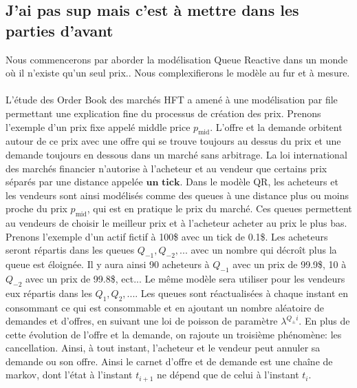 \documentclass[12pt,a4paper]{article}
\theoremstyle{definition}
\theoremstyle{remark}
\begin{document}
\subsection{J'ai pas sup mais c'est à mettre dans les parties d'avant}
Nous commencerons par aborder la modélisation Queue Reactive dans un monde où il n'existe qu'un seul prix.. Nous complexifierons le modèle au fur et à mesure.
\\
\\
L'étude des Order Book des marchés HFT a amené à une modélisation par file permettant une explication fine du processus de création des prix. Prenons l'exemple d'un prix fixe appelé middle price $p_{\text{mid}}$. L'offre et la demande orbitent autour de ce prix avec une offre qui se trouve toujours au dessus du prix et une demande toujours en dessous dans un marché sans arbitrage. La loi international des marchés financier n'autorise à l'acheteur et au vendeur que certains prix séparés par une distance appelée $\textbf{un tick}$. Dans le modèle QR, les acheteurs et les vendeurs sont ainsi modélisés comme des queues à une distance plus ou moins proche du prix $p_{\text{mid}}$, qui est en pratique le prix du marché. Ces queues permettent au vendeurs de choisir le meilleur prix et à l'acheteur acheter au prix le plus bas. Prenons l'exemple d'un actif fictif à 100\$ avec un tick de 0.1\$. Les acheteurs seront répartis dans les queues $Q_{-1},Q_{-2},...$ avec un nombre qui décroît plus la queue est éloignée. Il y aura ainsi 90 acheteurs à $Q_{-1}$ avec un prix de 99.9\$, 10 à $Q_{-2}$ avec un prix de 99.8\$, ect... Le même modèle sera utiliser pour les vendeurs eux répartis dans les $Q_{1},Q_2,...$. Les queues sont réactualisées à chaque instant en consommant ce qui est consommable et en ajoutant un nombre aléatoire de demandes et d'offres, en suivant une loi de poisson de paramètre $\lambda^{Q_\pm i}$. En plus de cette évolution de l'offre et la demande, on rajoute un troisième phénomène: les cancellation. Ainsi, à tout instant, l'acheteur et le vendeur peut annuler sa demande ou son offre. Ainsi le carnet d'offre et de demande est une chaîne de markov, dont l'état à l'instant $t_{i+1}$ ne dépend que de celui à l'instant $t_i$.
\end{document}

